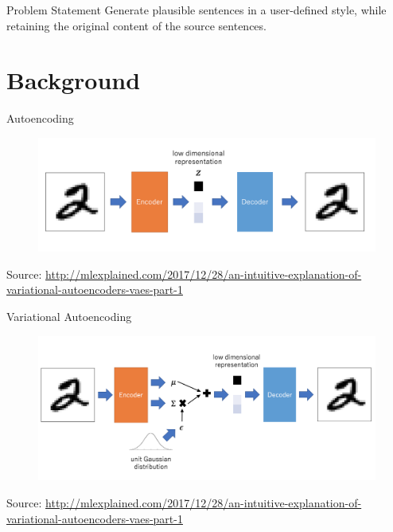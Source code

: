 \documentclass[aspectratio=169]{beamer}
\newcommand{\imgsrc}[1]{\tiny{Source: #1}}
\begin{document}
\begin{frame}{Problem Statement}
	\centering
	\Huge{Generate plausible sentences in a user-defined style, while retaining the original content of the source sentences.}
\end{frame}

% 

\section{Background}

\begin{frame}{Autoencoding}
	\centering
	\begin{figure}[ht]
		\includegraphics[width=\linewidth]{dae-structure}
	\end{figure}
    
    \imgsrc{\url{http://mlexplained.com/2017/12/28/an-intuitive-explanation-of-variational-autoencoders-vaes-part-1}}
\end{frame}

\begin{frame}{Variational Autoencoding}
	\centering
	\begin{figure}[ht]
		\includegraphics[width=\linewidth]{vae-structure}
	\end{figure}

    \imgsrc{\url{http://mlexplained.com/2017/12/28/an-intuitive-explanation-of-variational-autoencoders-vaes-part-1}}
\end{frame}
\end{document}
